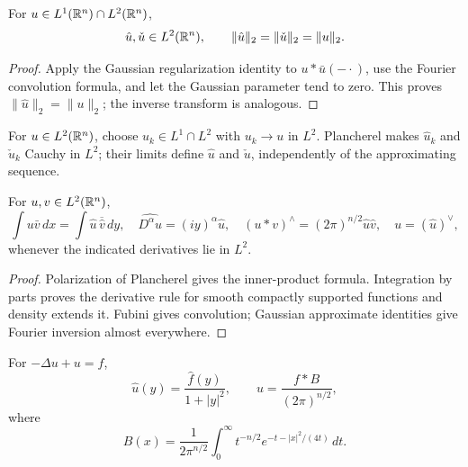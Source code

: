 \begin{theorem}
\label{thm:plancherel-theorem}

For $u\in L^1(\mathbb{R}^n)\cap L^2(\mathbb{R}^n)$,
\[
\hat u,\check u\in L^2(\mathbb{R}^n),\qquad
\|\hat u\|_2=\|\check u\|_2=\|u\|_2.
\]
\end{theorem}

\begin{proof}
\sketch Apply the Gaussian regularization identity to $u*\bar u(-\cdot)$,
use the Fourier convolution formula, and let the Gaussian parameter tend to
zero. This proves $\|\hat u\|_2=\|u\|_2$; the inverse transform is analogous.
\end{proof}

\begin{definition}
\label{def:fourier-transform-l2}

For $u\in L^2(\mathbb{R}^n)$, choose $u_k\in L^1\cap L^2$ with $u_k\to u$ in $L^2$.
Plancherel makes $\hat u_k$ and $\check u_k$ Cauchy in $L^2$; their limits
define $\hat u$ and $\check u$, independently of the approximating sequence.
\end{definition}

\begin{theorem}
\label{thm:fourier-transform-properties}

For $u,v\in L^2(\mathbb{R}^n)$,
\[
\int u\bar v\,dx=\int\hat u\,\overline{\hat v}\,dy,
\quad \widehat{D^\alpha u}=(iy)^\alpha\hat u,
\quad (u*v)^\wedge=(2\pi)^{n/2}\hat u\hat v,
\quad u=(\hat u)^\vee,
\]
whenever the indicated derivatives lie in $L^2$.
\end{theorem}

\begin{proof}
\sketch Polarization of Plancherel gives the inner-product formula.
Integration by parts proves the derivative rule for smooth compactly supported
functions and density extends it. Fubini gives convolution; Gaussian
approximate identities give Fourier inversion almost everywhere.
\end{proof}

\begin{example}
\label{ex:bessel-potentials}

For $-\Delta u+u=f$,
\[
\hat u(y)=\frac{\hat f(y)}{1+|y|^2},\qquad
u=\frac{f*B}{(2\pi)^{n/2}},
\]
where
\[
B(x)=\frac1{2\pi^{n/2}}\int_0^\infty t^{-n/2}e^{-t-|x|^2/(4t)}\,dt.
\]
\end{example}

